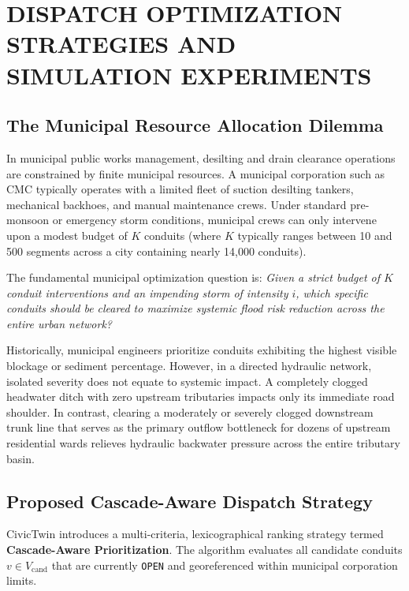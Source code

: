 \chapter{DISPATCH OPTIMIZATION STRATEGIES AND SIMULATION EXPERIMENTS}

\section{The Municipal Resource Allocation Dilemma}
In municipal public works management, desilting and drain clearance operations are constrained by finite municipal resources. A municipal corporation such as CMC typically operates with a limited fleet of suction desilting tankers, mechanical backhoes, and manual maintenance crews. Under standard pre-monsoon or emergency storm conditions, municipal crews can only intervene upon a modest budget of $K$ conduits (where $K$ typically ranges between 10 and 500 segments across a city containing nearly 14,000 conduits).

The fundamental municipal optimization question is: \textit{Given a strict budget of $K$ conduit interventions and an impending storm of intensity $i$, which specific conduits should be cleared to maximize systemic flood risk reduction across the entire urban network?}

Historically, municipal engineers prioritize conduits exhibiting the highest visible blockage or sediment percentage. However, in a directed hydraulic network, isolated severity does not equate to systemic impact. A completely clogged headwater ditch with zero upstream tributaries impacts only its immediate road shoulder. In contrast, clearing a moderately or severely clogged downstream trunk line that serves as the primary outflow bottleneck for dozens of upstream residential wards relieves hydraulic backwater pressure across the entire tributary basin.

\section{Proposed Cascade-Aware Dispatch Strategy}
CivicTwin introduces a multi-criteria, lexicographical ranking strategy termed \textbf{Cascade-Aware Prioritization}. The algorithm evaluates all candidate conduits $v \in V_{\text{cand}}$ that are currently \texttt{OPEN} and georeferenced within municipal corporation limits. 

